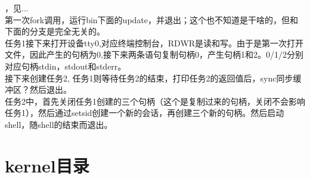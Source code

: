 \documentclass[12pt]{article}
\begin{document}
，见...\\
第一次fork调用，运行bin下面的update，并退出；这个也不知道是干啥的，但和下面的分支是完全无关的。\\
任务1接下来打开设备tty0,对应终端控制台，RDWR是读和写。由于是第一次打开文件，因此产生的句柄为0,接下来两条语句复制句柄0，产生句柄1和2。0/1/2分别对应句柄stdin，stdout和stderr。\\
接下来创建任务2, 任务1则等待任务2的结束，打印任务2的返回值后，sync同步缓冲区？然后退出。\\
任务2中，首先关闭任务1创建的三个句柄（这个是复制过来的句柄，关闭不会影响任务1），然后通过setsid创建一个新的会话，再创建三个新的句柄。然后启动shell，随shell的结束而退出。
\part{kernel目录}
\end{document}
